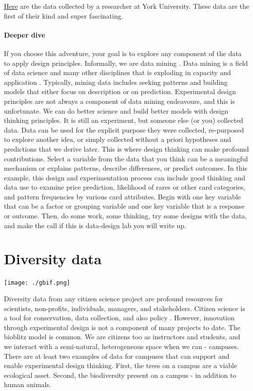 \documentclass[
]{book}
\begin{document}
\href{https://figshare.com/articles/dataset/Magic_The_Gathering_Data/12797474}{Here} are the data collected by a researcher at York University. These data are the first of their kind and super fascinating.

\hypertarget{deeper-dive-3}{%
\subsubsection*{Deeper dive}\label{deeper-dive-3}}

If you choose this adventure, your goal is to explore any component of the data to apply design principles. Informally, we are data mining \citep{RN6800}. Data mining is a field of data science and many other disciplines that is exploding in capacity and application \citep{RN6802, RN6801}. Typically, mining data includes seeking patterns and building models that either focus on description or on prediction. Experimental design principles are not always a component of data mining endeavours, and this is unfortunate. We can do better science and build better models with design thinking principles. It is still an experiment, but someone else (or you) collected data. Data can be used for the explicit purpose they were collected, re-purposed to explore another idea, or simply collected without a priori hypotheses and predictions that we derive later. This is where design thinking can make profound contributions. Select a variable from the data that you think can be a meaningful mechanism or explains patterns, describe differences, or predict outcomes. In this example, this design and experimentation process can include good thinking and data use to examine price prediction, likelihood of rares or other card categories, and pattern frequencies by various card attributes. Begin with one key variable that can be a factor or grouping variable and one key variable that is a response or outcome. Then, do some work, some thinking, try some designs with the data, and make the call if this is data-design lab you will write up.

\hypertarget{diversity}{%
\chapter{Diversity data}\label{diversity}}

\texttt{[image: ./gbif.png]}

Diversity data from any citizen science project are profound resources for scientists, non-profits, individuals, managers, and stakeholders. Citizen science is a tool for conservation, data collection, and also policy \citep{RN1320, RN5997}. However, innovation through experimental design is not a component of many projects to date. The bioblitz model is common. We are citizens too as instructors and students, and we interact with a semi-natural, heterogeneous space when we can - campuses. There are at least two examples of data for campuses that can support and enable experimental design thinking. First, the trees on a campus are a viable ecological asset. Second, the biodiversity present on a campus - in addition to human animals.
\end{document}

